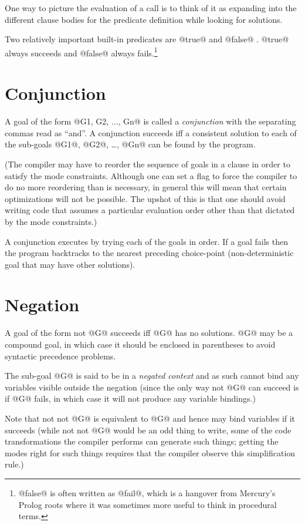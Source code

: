 One way to picture the evaluation of a call is to think of it
as expanding into the different clause bodies for the
predicate definition while looking for solutions.

Two relatively important built-in predicates are @true@ and
@false@ \XXX{}.  @true@ always succeeds and @false@ always fails.\footnote{@false@ is often written as @fail@, which is a hangover
from Mercury's Prolog roots where it was sometimes more useful
to think in procedural terms.}

\section{Conjunction}

A goal of the form @G1, G2, ..., Gn@ is called a \emph{conjunction}
with the separating commas read as ``and''.  A conjunction
succeeds iff a consistent solution to each of the sub-goals @G1@,
@G2@, \ldots, @Gn@ can be found by the program.

(The compiler may have to reorder the sequence of goals in a
clause in order to satisfy the mode constraints.  Although one
can set a flag to force the compiler to do no more reordering
than is necessary, in general this will mean that certain
optimizations will not be possible.  The upshot of this is
that one should avoid writing code that assumes a particular
evaluation order other than that dictated by the mode
constraints.)

A conjunction executes by trying each of the goals in order.
If a goal fails then the program backtracks to the nearest
preceding choice-point (\ie non-deterministic goal that may
have other solutions).

\section{Negation}

A goal of the form not @G@ succeeds iff @G@ has no solutions.  @G@
may be a compound goal, in which case it should be enclosed in
parentheses to avoid syntactic precedence problems.

The sub-goal @G@ is said to be in a \emph{negated context} and as
such cannot bind any variables visible outside the negation
(since the only way not @G@ can succeed is if @G@ fails, in which
case it will not produce any variable bindings.)

Note that not not @G@ is equivalent to @G@ and hence may bind
variables if it succeeds (while not not @G@ would be an odd
thing to write, some of the code transformations the compiler
performs can generate such things; getting the modes right for
such things requires that the compiler observe this
simplification rule.)

